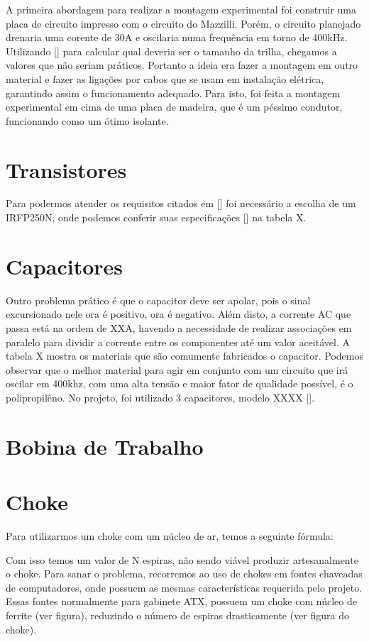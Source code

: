 A primeira abordagem para realizar a montagem experimental foi construir uma placa de circuito impresso com o circuito do Mazzilli. Porém, o circuito planejado drenaria uma corente de 30A e oscilaria numa frequência em torno de 400kHz. Utilizando [] para calcular qual deveria ser o tamanho da trilha, chegamos a valores que não seriam práticos. Portanto a ideia era fazer a montagem em outro material e fazer as ligações por cabos que se usam em instalação elétrica, garantindo assim o funcionamento adequado. Para isto, foi feita a montagem experimental em cima de uma placa de madeira, que é um péssimo condutor, funcionando como um ótimo isolante. 
\section{Transistores}
Para podermos atender os requisitos citados em [] foi necessário a escolha de um IRFP250N, onde podemos conferir suas especificações [] na tabela X.
\section{Capacitores}
Outro problema prático é que o capacitor deve ser apolar, pois o sinal excursionado nele ora é positivo, ora é negativo. Além disto, a corrente AC que passa está na ordem de XXA, havendo a necessidade de realizar associações em paralelo para dividir a corrente entre os componentes até um valor aceitável. A tabela X mostra os materiais que são comumente fabricados o capacitor. Podemos observar que o melhor material para agir em conjunto com um circuito que irá oscilar em 400khz, com uma alta tensão e maior fator de qualidade possível, é o polipropilêno. No projeto, foi utilizado 3 capacitores, modelo XXXX [].
\section{Bobina de Trabalho}

\section{Choke}
Para utilizarmos um choke com um núcleo de ar, temos a seguinte fórmula:

Com isso temos um valor de N espiras, não sendo viável produzir artesanalmente o choke. Para sanar o problema, recorremos ao uso de chokes em fontes chaveadas de computadores, onde possuem as mesmas características requerida pelo projeto. Essas fontes normalmente para gabinete ATX, possuem um choke com núcleo de ferrite (ver figura), reduzindo o número de espiras drasticamente (ver figura do choke).
